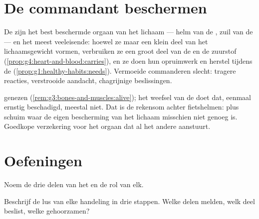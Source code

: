 \section{De commandant beschermen}

\begin{proposition}\label{prop:g5:brain-in-command:protect}
De  zijn het best beschermde orgaan van het lichaam --- helm van
de , zuil van de  --- en het meest veeleisende: hoewel
ze maar een klein deel van het lichaamsgewicht vormen, verbruiken ze een
groot deel van de  en de zuurstof
(\cref{prop:g4:heart-and-blood:carries}), en ze doen hun opruimwerk en
herstel tijdens de \emph{}
(\cref{prop:g1:healthy-habits:needs}). Vermoeide  commanderen
slecht: tragere reacties, verstrooide aandacht, chagrijnige beslissingen.
\end{proposition}
\admitted

\begin{example}\label{ex:g5:brain-in-command:helmet}
 genezen (\cref{rem:g3:bones-and-muscles:alive}); het weefsel van
de  doet dat, eenmaal ernstig beschadigd, meestal niet. Dat is
de rekensom achter fietshelmen:  plus schuim waar de eigen
bescherming van het lichaam misschien niet genoeg is. Goedkope
verzekering voor het orgaan dat al het andere aanstuurt.
\end{example}

\section{Oefeningen}

\begin{exercise}[$\star$]\label{exo:g5:brain-in-command:1}
Noem de drie delen van het  en de rol van elk.
\end{exercise}

\begin{exercise}[$\star$]\label{exo:g5:brain-in-command:2}
Beschrijf de lus van elke handeling in drie stappen. Welke delen melden,
welk deel beslist, welke gehoorzamen?
\end{exercise}

